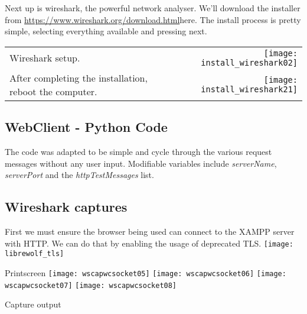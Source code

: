 \documentclass[11pt,a4paper]{report}
\begin{document}
        Next up is wireshark, the powerful network analyser.
        We'll download the installer from \url{https://www.wireshark.org/download.html}{here}.
        The install process is pretty simple, selecting everything available and pressing next.
        \begin{tabular}{ l r }
            Wireshark setup.                                        & \texttt{[image: install\_wireshark02]} \\
            After completing the installation, reboot the computer. & \texttt{[image: install\_wireshark21]} \\
        \end{tabular}

    \subsection{WebClient - Python Code}
        \lstset{style=pythoncode}
        
        The code was adapted to be simple and cycle through the various request messages without any user input.
        Modifiable variables include \textit{serverName}, \textit{serverPort} and the \textit{httpTestMessages} list.

    
    \subsection{Wireshark captures}
        First we must ensure the browser being used can connect to the XAMPP server with HTTP. We can do that by enabling the usage of deprecated TLS.
        \texttt{[image: librewolf\_tls]} 

        Printscreen
        \texttt{[image: wscapwcsocket05]} %
        \texttt{[image: wscapwcsocket06]} %
        \texttt{[image: wscapwcsocket07]} %
        \texttt{[image: wscapwcsocket08]} %

        Capture output
\end{document}
